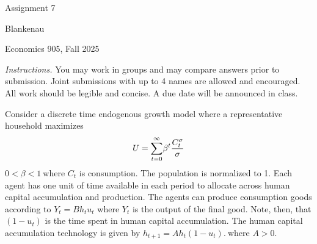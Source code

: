 \documentclass{article}
\begin{document}
\begin{center}
{\LARGE Assignment 7}
\end{center}

\noindent Blankenau

\noindent Economics 905, Fall 2025\medskip 

\noindent \noindent \textit{Instructions.} You may work in groups and may
compare answers prior to submission. Joint submissions with up to 4 names
are allowed and encouraged. All work should be legible and concise. A due
date will be announced in class.

\medskip \medskip Consider a discrete time endogenous growth model where a
representative household maximizes%
\begin{equation*}
U=\overset{\infty }{\underset{t=0}{\sum }}\beta ^{t}\frac{C_{t}^{\sigma }}{%
\sigma }
\end{equation*}%
$0<\beta <1\ $where $C_{t}$ is consumption. The population is normalized to
1. Each agent has one unit of time available in each period to allocate
across human capital accumulation and production. The agents can produce
consumption goods according to $Y_{t}=Bh_{t}u_{t}$ where $Y_{t}$ is the
output of the final good$.$ Note, then, that $\left( 1-u_{t}\right) $ is the
time spent in human capital accumulation. The human capital accumulation
technology is given by $h_{t+1}=Ah_{t}\left( 1-u_{t}\right) .\ $where $A>0.$
\end{document}
